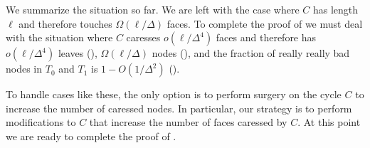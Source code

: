 \documentclass{patmorin}
\newcommand{\dual}[1]{{#1}^\star}
\begin{document}
We summarize the situation so far.  We are left with the case where
$C$ has length $\ell$ and therefore touches $\Omega(\ell/\Delta)$
faces.  To complete the proof of  we must deal with
the situation where $C$ caresses $o(\ell/\Delta^4)$ faces and
therefore has $o(\ell/\Delta^4)$ leaves (),
$\Omega(\ell/\Delta)$ nodes (),
and the fraction of really really bad nodes in $T_0$ and $T_1$ is
$1-O(1/\Delta^2)$ (). 



To handle cases like these, the only option is to perform surgery on
the cycle $C$ to increase the number of caressed nodes. In particular,
our strategy is to perform modifications to $C$ that increase the number
of faces caressed by $C$.
%
%
%
At this point we are ready to complete the proof of .
\end{document}
